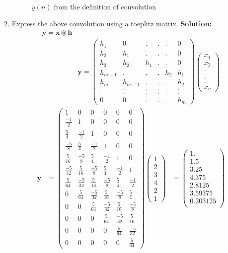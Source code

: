 \documentclass[journal,12pt,twocolumn]{IEEEtran}
\newcommand{\solution}{\noindent \textbf{Solution: }}
\let\vec\mathbf
\numberwithin{equation}{section}
\renewcommand\thesection{\arabic{section}}
\newcommand{\myvec}[1]{\ensuremath{\begin{pmatrix}#1\end{pmatrix}}}
\begin{document}
\begin{enumerate}[label=\thesection.\arabic*]
\begin{figure}[!ht]
\caption{$y(n)$ from the definition of convolution}
\label{fig:ynconv}
\end{figure}
\item Express the above convolution using a toeplitz matrix.
\solution
\begin{align}
\vec{y} = \vec{x} \circledast \vec{h}\\
& \vec{y} = \myvec{ h_1 & 0 & . & . & . & 0 \\ h_2 & h_1 & . & . & . & 0 \\ h_3 & h_2 & h_1 & . & . & 0 \\ h_{m-1} & . & . & . & h_2 & h_1 \\ h_m & h_{m-1} &. & . & . & h_2 \\ . & . &. & . & . & . \\ . & . & . & . & . & . \\ 0 & 0 & . & . & . & h_m } \myvec{x_1 \\ x_2 \\ . \\ . \\ . \\ . \\ x_n}
\end{align}
\begin{align}
\vec{y}&=\myvec{1 & 0&0 & 0 & 0 & 0 \\ \frac{-1}{2} & 1&0&0&0&0\\\frac{5}{4}&\frac{-1}{2}&1&0&0&0\\\frac{-5}{8}&\frac{5}{4}&\frac{-1}{2}&1&0&0\\\frac{5}{16}&\frac{-5}{8}&\frac{5}{4}&\frac{-1}{2}&1&0\\ \frac{-5}{32}&\frac{5}{16}&\frac{-5}{8}&\frac{5}{4}&\frac{-1}{2}&1\\\frac{5}{64}&\frac{-5}{32}&\frac{5}{16}&\frac{-5}{8}&\frac{5}{4}&\frac{-1}{2}\\ 0&\frac{5}{64}&\frac{-5}{32}&\frac{5}{16}&\frac{-5}{8}&\frac{5}{4}\\0&0&\frac{5}{64}&\frac{-5}{32}&\frac{5}{16}&\frac{-5}{8}\\0&0&0&\frac{5}{64}&\frac{-5}{32}&\frac{5}{16}\\0&0&0&0&\frac{5}{64}&\frac{-5}{32}\\0&0&0&0&0&\frac{5}{64}}\myvec{1\\2\\3\\4\\2\\1}
&=\myvec{1.   \\     1.5\\3.25\\4.375\\2.8125   \\3.59375\\   0.203125\\
}
\end{align}
\end{enumerate}
\end{document}
